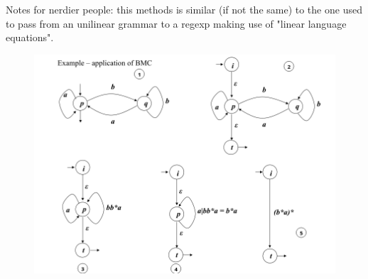 		Notes for nerdier people: this methods is similar (if not the same) to the one used to pass from an unilinear grammar to a regexp making use of "linear 
		language equations".
		\begin{figure}[htp]
			\centering
			\includegraphics[width = \textwidth]{./images/BMCMethod.png}
		\end{figure}
	
